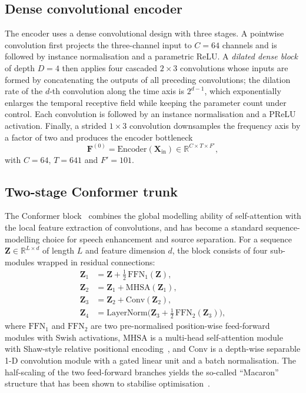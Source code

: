 \documentclass[a4paper,fleqn]{cas-dc}
\begin{document}
\subsection{Dense convolutional encoder}\label{sec:method:encoder}

The encoder uses a dense convolutional design with three stages. A pointwise convolution first projects the
three-channel input to $C=64$ channels and is followed by instance
normalisation and a parametric ReLU. A \emph{dilated dense block} of
depth $D=4$ then applies four cascaded $2\times 3$ convolutions whose
inputs are formed by concatenating the outputs of all preceding
convolutions; the dilation rate of the $d$-th convolution along the time
axis is $2^{d-1}$, which exponentially enlarges the temporal receptive
field while keeping the parameter count under control. Each
convolution is followed by an instance normalisation and a PReLU
activation. Finally, a strided $1\times 3$ convolution downsamples the
frequency axis by a factor of two and produces the encoder bottleneck
\begin{equation}\label{eq:encoder}
  \mathbf{F}^{(0)} = \mathrm{Encoder}(\mathbf{X}_{\mathrm{in}})
        \in \mathbb{R}^{C\times T\times F'},
\end{equation}
with $C=64$, $T=641$ and $F'=101$.

\subsection{Two-stage Conformer trunk}\label{sec:method:tscb}

The Conformer block~\citep{gulati2020conformer} combines the global
modelling ability of self-attention with the local feature extraction
of convolutions, and has become a standard sequence-modelling choice
for speech enhancement and source separation. For a sequence
$\mathbf{Z}\in\mathbb{R}^{L\times d}$ of length $L$ and feature
dimension $d$, the block consists of four sub-modules wrapped in
residual connections:
\begin{equation}\label{eq:conformer}
  \begin{aligned}
    \mathbf{Z}_1 &= \mathbf{Z} + \tfrac{1}{2}\,\mathrm{FFN}_1(\mathbf{Z}),\\
    \mathbf{Z}_2 &= \mathbf{Z}_1 + \mathrm{MHSA}(\mathbf{Z}_1),\\
    \mathbf{Z}_3 &= \mathbf{Z}_2 + \mathrm{Conv}(\mathbf{Z}_2),\\
    \mathbf{Z}_4 &= \mathrm{LayerNorm}\bigl(\mathbf{Z}_3 +
                    \tfrac{1}{2}\,\mathrm{FFN}_2(\mathbf{Z}_3)\bigr),
  \end{aligned}
\end{equation}
where $\mathrm{FFN}_1$ and $\mathrm{FFN}_2$ are two pre-normalised
position-wise feed-forward modules with Swish activations,
$\mathrm{MHSA}$ is a multi-head self-attention module with Shaw-style
relative positional encoding~\citep{shaw2018relativepos}, and
$\mathrm{Conv}$ is a depth-wise separable 1-D convolution module with a
gated linear unit and a batch normalisation. The half-scaling of the two
feed-forward branches yields the so-called ``Macaron'' structure that
has been shown to stabilise optimisation~\citep{gulati2020conformer}.
\end{document}
